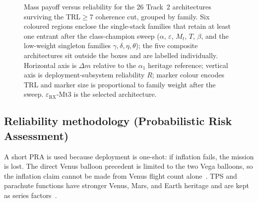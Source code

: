 \begin{figure}[H]
\caption{Mass payoff versus reliability for the 26 Track~2 architectures surviving the TRL$\geq$7 coherence cut, grouped by family. Six coloured regions enclose the single-stack families that retain at least one entrant after the class-champion sweep ($\alpha$, $\varepsilon$, $M_t$, $T$, $\beta$, and the low-weight singleton families $\gamma,\delta,\eta,\theta$); the five composite architectures sit outside the boxes and are labelled individually. Horizontal axis is $\Delta m$ relative to the $\alpha_1$ heritage reference; vertical axis is deployment-subsystem reliability $R$; marker colour encodes TRL and marker size is proportional to family weight after the sweep. $\varepsilon_{\mathrm{RX}}$-Mt3 is the selected architecture.}
\label{fig:track2_mass_reliability}
\end{figure}

\subsection{Reliability methodology (Probabilistic Risk Assessment)}
\label{sec:deployment-pra}
\label{sec:dep-pra}

A short PRA is used because deployment is one-shot: if inflation fails, the mission is lost. The direct Venus balloon precedent is limited to the two Vega balloons, so the inflation claim cannot be made from Venus flight count alone~\cite{Sagdeev1986,Linkin1986}. TPS and parachute functions have stronger Venus, Mars, and Earth heritage and are kept as series factors~\cite{Seiff1991,Garvin2022,Steltzner2014,Witkowski2013}.

